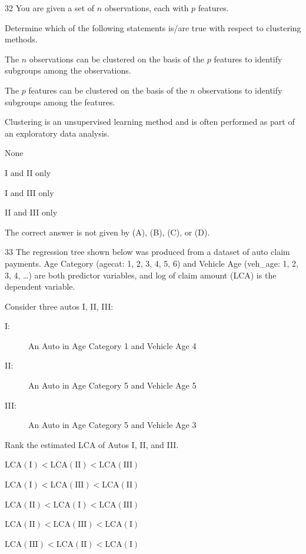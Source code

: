 \begin{question}{32}
You are given a set of $n$ observations, each with $p$ features.

Determine which of the following statements is/are true with respect to clustering methods.
\begin{statements}
\item The $n$ observations can be clustered on the basis of the $p$ features to identify subgroups among the observations.
\item The $p$ features can be clustered on the basis of the $n$ observations to identify subgroups among the features.
\item Clustering is an unsupervised learning method and is often performed as part of an exploratory data analysis.
\end{statements}

\begin{choices}
\item None
\item I and II only
\item I and III only
\item II and III only
\item The correct answer is not given by (A), (B), (C), or (D).
\end{choices}
\end{question}

\begin{question}{33}
The regression tree shown below was produced from a dataset of auto claim payments. Age Category (agecat: 1, 2, 3, 4, 5, 6) and Vehicle Age (veh\_age: 1, 2, 3, 4, \ldots) are both predictor variables, and log of claim amount (LCA) is the dependent variable.


Consider three autos I, II, III:

\begin{description}
\item[I:] An Auto in Age Category 1 and Vehicle Age 4
\item[II:] An Auto in Age Category 5 and Vehicle Age 5
\item[III:] An Auto in Age Category 5 and Vehicle Age 3
\end{description}

Rank the estimated LCA of Autos I, II, and III.

\begin{choices}
\item $\mathrm{LCA(I)} < \mathrm{LCA(II)} < \mathrm{LCA(III)}$
\item $\mathrm{LCA(I)} < \mathrm{LCA(III)} < \mathrm{LCA(II)}$
\item $\mathrm{LCA(II)} < \mathrm{LCA(I)} < \mathrm{LCA(III)}$
\item $\mathrm{LCA(II)} < \mathrm{LCA(III)} < \mathrm{LCA(I)}$
\item $\mathrm{LCA(III)} < \mathrm{LCA(II)} < \mathrm{LCA(I)}$
\end{choices}
\end{question}

